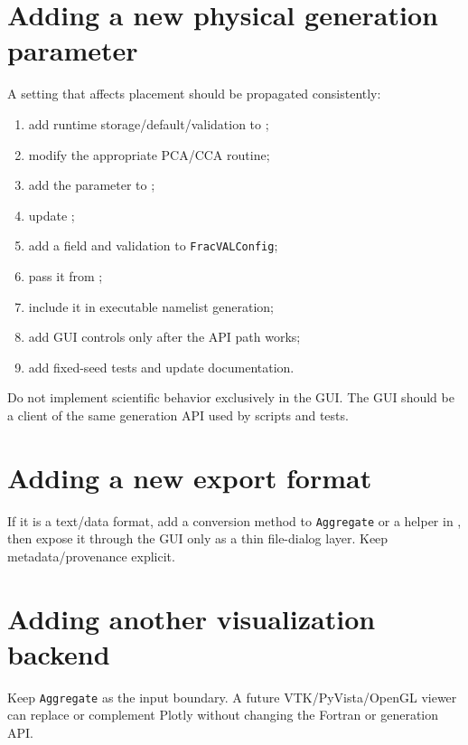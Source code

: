 \documentclass[11pt,oneside]{report}
\newcommand{\code}[1]{\texttt{#1}}
\begin{document}
\section{Adding a new physical generation parameter}

A setting that affects placement should be propagated consistently:

\begin{enumerate}
  \item add runtime storage/default/validation to ;
  \item modify the appropriate PCA/CCA routine;
  \item add the parameter to ;
  \item update ;
  \item add a field and validation to \code{FracVALConfig};
  \item pass it from ;
  \item include it in executable namelist generation;
  \item add GUI controls only after the API path works;
  \item add fixed-seed tests and update documentation.
\end{enumerate}

\begin{importantbox}
Do not implement scientific behavior exclusively in the GUI. The GUI should be
a client of the same generation API used by scripts and tests.
\end{importantbox}

\section{Adding a new export format}

If it is a text/data format, add a conversion method to \code{Aggregate} or a
helper in , then expose it through the GUI only as a thin file-dialog
layer. Keep metadata/provenance explicit.

\section{Adding another visualization backend}

Keep \code{Aggregate} as the input boundary. A future VTK/PyVista/OpenGL viewer
can replace or complement Plotly without changing the Fortran or generation
API.
\end{document}
